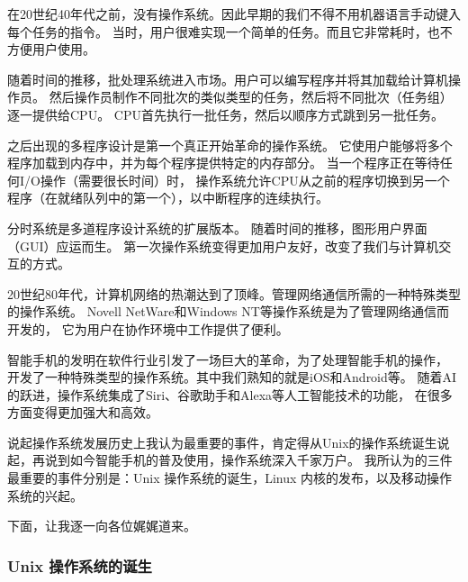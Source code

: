 \documentclass[UTF8]{homework}
\begin{document}
\begin{homeworkProblem}
在20世纪40年代之前，没有操作系统。因此早期的我们不得不用机器语言手动键入每个任务的指令。
当时，用户很难实现一个简单的任务。而且它非常耗时，也不方便用户使用。

\vspace{\baselineskip}

随着时间的推移，批处理系统进入市场。用户可以编写程序并将其加载给计算机操作员。
然后操作员制作不同批次的类似类型的任务，然后将不同批次（任务组）逐一提供给CPU。
CPU首先执行一批任务，然后以顺序方式跳到另一批任务。

\vspace{\baselineskip}

之后出现的多程序设计是第一个真正开始革命的操作系统。
它使用户能够将多个程序加载到内存中，并为每个程序提供特定的内存部分。
当一个程序正在等待任何I/O操作（需要很长时间）时，
操作系统允许CPU从之前的程序切换到另一个程序（在就绪队列中的第一个），以中断程序的连续执行。

\vspace{\baselineskip}

分时系统是多道程序设计系统的扩展版本。
随着时间的推移，图形用户界面（GUI）应运而生。
第一次操作系统变得更加用户友好，改变了我们与计算机交互的方式。

\vspace{\baselineskip}

20世纪80年代，计算机网络的热潮达到了顶峰。管理网络通信所需的一种特殊类型的操作系统。
Novell NetWare和Windows NT等操作系统是为了管理网络通信而开发的，
它为用户在协作环境中工作提供了便利。

\vspace{\baselineskip}

智能手机的发明在软件行业引发了一场巨大的革命，为了处理智能手机的操作，
开发了一种特殊类型的操作系统。其中我们熟知的就是iOS和Android等。
随着AI的跃进，操作系统集成了Siri、谷歌助手和Alexa等人工智能技术的功能，
在很多方面变得更加强大和高效。

\vspace{\baselineskip}

说起操作系统发展历史上我认为最重要的事件，肯定得从Unix的操作系统诞生说起，再说到如今智能手机的普及使用，操作系统深入千家万户。
我所认为的三件最重要的事件分别是：Unix 操作系统的诞生，Linux 内核的发布，以及移动操作系统的兴起。

\vspace{\baselineskip}

下面，让我逐一向各位娓娓道来。

\subsubsection{Unix 操作系统的诞生}


\end{homeworkProblem}
\end{document}
